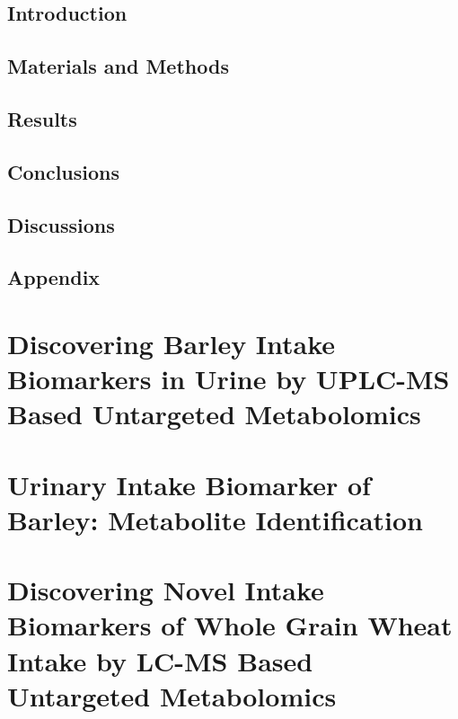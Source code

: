 \documentclass[]{report}
\begin{document}
	\section{Introduction}
	
	
	\section{Materials and Methods}
	
	
	\section{Results}
	
		
	\section{Conclusions}
	
	
	\section{Discussions}
	
	\newpage
	\section{Appendix}
	

\chapter{Discovering Barley Intake Biomarkers in Urine by UPLC-MS Based Untargeted Metabolomics}
	

\chapter{Urinary Intake Biomarker of Barley: Metabolite Identification}


\chapter{Discovering Novel Intake Biomarkers of Whole Grain Wheat Intake by LC-MS Based Untargeted Metabolomics}


%
\end{document}
